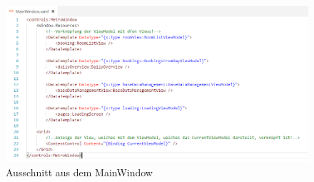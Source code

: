 \begin{figure}[h]
	\begin{center}
		\includegraphics[width=\columnwidth]{Implementierung/MainWindow.png}
	\end{center}
	\caption{Ausschnitt aus dem MainWindow}
	\label{fig:mainWindow}
\end{figure}